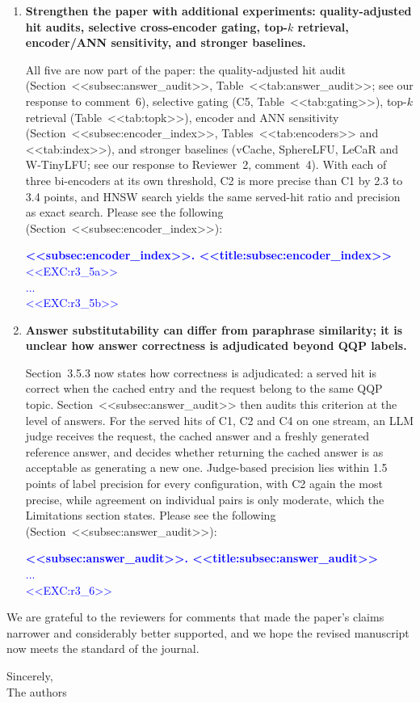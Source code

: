 \documentclass[11pt]{article}
\begin{document}
\begin{enumerate}[leftmargin=*, itemsep=1.2em]
\textcolor{blue}{\textbf{<<subsubsec:eviction_policy_impact>>. <<title:subsubsec:eviction_policy_impact>>}\\
...\\
To see why semantic retention gains little, Table~<<tab:eviction_density>> records the cache contents at every eviction at capacity 400: the number of live entries within the hit radius of the victim, the share of victims whose topic is still covered by another live entry, and the share of victims that were never hit. <<EXC:r3_4>>}

\item \textbf{Strengthen the paper with additional experiments: quality-adjusted hit audits, selective cross-encoder gating, top-$k$ retrieval, encoder/ANN sensitivity, and stronger baselines.}

All five are now part of the paper: the quality-adjusted hit audit (Section~<<subsec:answer_audit>>, Table~<<tab:answer_audit>>; see our response to comment~6), selective gating (C5, Table~<<tab:gating>>), top-$k$ retrieval (Table~<<tab:topk>>), encoder and ANN sensitivity (Section~<<subsec:encoder_index>>, Tables~<<tab:encoders>> and <<tab:index>>), and stronger baselines (vCache, SphereLFU, LeCaR and W-TinyLFU; see our response to Reviewer~2, comment~4). With each of three bi-encoders at its own threshold, C2 is more precise than C1 by 2.3 to 3.4 points, and HNSW search yields the same served-hit ratio and precision as exact search. Please see the following (Section~<<subsec:encoder_index>>):

\textcolor{blue}{\textbf{<<subsec:encoder_index>>. <<title:subsec:encoder_index>>}\\
<<EXC:r3_5a>>\\
...\\
<<EXC:r3_5b>>}

\item \textbf{Answer substitutability can differ from paraphrase similarity; it is unclear how answer correctness is adjudicated beyond QQP labels.}

Section~3.5.3 now states how correctness is adjudicated: a served hit is correct when the cached entry and the request belong to the same QQP topic. Section~<<subsec:answer_audit>> then audits this criterion at the level of answers. For the served hits of C1, C2 and C4 on one stream, an LLM judge receives the request, the cached answer and a freshly generated reference answer, and decides whether returning the cached answer is as acceptable as generating a new one. Judge-based precision lies within 1.5 points of label precision for every configuration, with C2 again the most precise, while agreement on individual pairs is only moderate, which the Limitations section states. Please see the following (Section~<<subsec:answer_audit>>):

\textcolor{blue}{\textbf{<<subsec:answer_audit>>. <<title:subsec:answer_audit>>}\\
...\\
<<EXC:r3_6>>}

\end{enumerate}

\bigskip
\noindent We are grateful to the reviewers for comments that made the paper's claims narrower and considerably better supported, and we hope the revised manuscript now meets the standard of the journal.

\bigskip
\noindent Sincerely, \\
{The authors}
\end{document}
